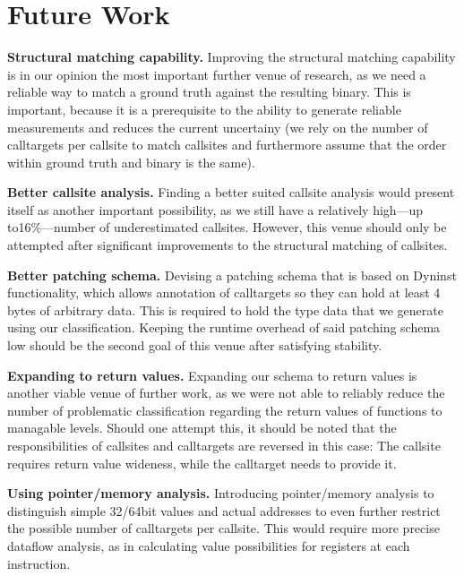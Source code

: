 \section{Future Work}
\label{chapter:Future_Work}
\textbf{Structural matching capability.} 
Improving the structural matching capability is in our opinion the most 
important further venue of research, as we need a reliable way to 
match a ground truth against the resulting binary. This is important, 
because it is a prerequisite to the ability to generate reliable 
measurements and reduces the current uncertainy (we rely on the 
number of calltargets per callsite to match callsites and furthermore
assume that the order within ground truth and binary is the same).

\textbf{Better callsite analysis.} 
Finding a better suited callsite analysis would present 
itself as another important possibility, as we still have a relatively 
high---up to16\%---number of underestimated callsites. 
However, this venue should only be attempted after significant 
improvements to the structural matching of callsites.

\textbf{Better patching schema.} 
Devising a patching schema
that is based on Dyninst functionality, 
which allows annotation of calltargets so they can hold at least 
4 bytes of arbitrary data. This is required to hold the type data that
we generate using our classification. Keeping the runtime overhead
of said patching schema low should be the second goal of this venue 
after satisfying stability.

\textbf{Expanding to return values.} 
Expanding our schema to return values
is another viable venue of further work, as we were not able to 
reliably reduce the number of problematic classification regarding 
the return values of functions to 
managable levels. Should one attempt this, it should be noted that the
responsibilities of callsites and calltargets are reversed in this 
case: The callsite requires return value wideness, while the calltarget
needs to provide it.

\textbf{Using pointer/memory analysis.} 
Introducing pointer/memory analysis
to distinguish simple 32/64bit values and actual addresses to even further restrict the 
possible number of calltargets per callsite. This would require more 
precise dataflow analysis, as in calculating value possibilities for 
registers at each instruction.
